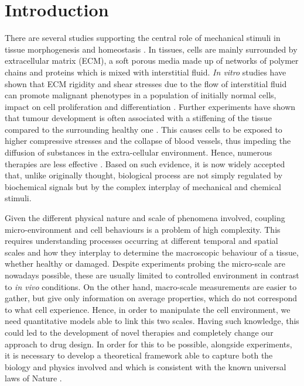 \section{Introduction}

There are several studies supporting the central role of mechanical stimuli in tissue morphogenesis and homeostasis \cite{ex1,ex2}. In tissues, cells are mainly surrounded by extracellular matrix (ECM), a soft porous media made up of networks of polymer chains and proteins which is mixed with interstitial fluid. \textit{In vitro} studies have shown that ECM rigidity and shear stresses due to the flow of interstitial fluid can promote malignant phenotypes in a population of initially normal cells, impact on cell proliferation and differentiation \cite{ex3}. Further experiments have shown that tumour development is often associated with a stiffening of the tissue compared to the surrounding healthy one \cite{ex4}. This causes cells to be exposed to higher compressive stresses and the collapse of blood vessels, thus impeding the diffusion of substances in the extra-cellular environment. Hence, numerous therapies are less effective \cite{ecm2}. Based on such evidence, it is now widely accepted that, unlike originally thought, biological process are not simply regulated by biochemical signals but by the complex interplay of mechanical and chemical stimuli.
 
Given the different physical nature and scale of phenomena involved, coupling micro-environment and cell behaviours is a problem of high complexity. This requires understanding processes occurring at different temporal and spatial scales and how they interplay to determine the macroscopic behaviour of a tissue, whether healthy or damaged. Despite experiments probing the micro-scale are nowadays possible, these are usually limited to controlled environment in contrast to \textit{in vivo} conditions. On the other hand, macro-scale measurements are easier to gather, but give only information on average properties, which do not correspond to what cell experience. Hence, in order to manipulate the cell environment, we need quantitative models able to link this two scales. Having such knowledge, this could led to the development of novel therapies and completely change our approach to  drug design. In order for this to be possible, alongside experiments, it is necessary to develop a theoretical framework able to capture both the biology and physics involved and which is consistent with the known universal laws of Nature \cite{NET}. 

